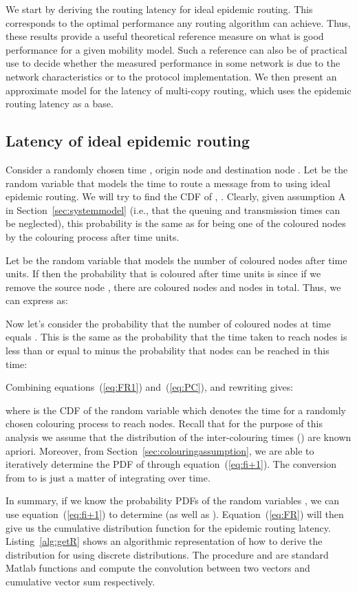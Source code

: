 \documentclass{article}
\begin{document}
We start by deriving the routing latency for ideal epidemic
routing. This corresponds to the optimal performance any routing
algorithm can achieve. Thus, these results provide a useful
theoretical reference measure on what is good performance for a given
mobility model. Such a reference can also be of practical use to
decide whether the measured performance in some network is due to the
network characteristics or to the protocol implementation. We then
present an approximate model for the latency of multi-copy routing,
which uses the epidemic routing latency as a base.


\subsection{Latency of ideal epidemic routing}

Consider a randomly chosen time , origin node  and destination
node . Let  be the random variable that models the time
to route a message from  to  using ideal epidemic routing. We
will try to find the CDF of , . Clearly, given
assumption A in Section~\ref{sec:systemmodel} (i.e., that the queuing and transmission times can be
neglected), this probability is the same as for  being one of the
coloured nodes by the colouring process  after  time
units.

Let  be the random variable that models the number of coloured
nodes after  time units. If  then the probability that 
is coloured after  time units is  since if we remove
the source node , there are  coloured nodes and  nodes in
total. Thus, we can express  as:

Now let's consider the probability  that the number of
coloured nodes at time  equals . This is the same as the
probability that the time taken to reach  nodes is less than or
equal to  minus the probability that  nodes can be reached in this time:

Combining equations~(\ref{eq:FR1}) and~(\ref{eq:PC}), and rewriting gives:

where  is the CDF of the random variable 
which denotes the time for a randomly chosen colouring process to
reach  nodes.  Recall that for the purpose of this analysis we
assume that the distribution of the inter-colouring times ()
are known apriori. Moreover, from
Section~\ref{sec:colouringassumption}, we are able to iteratively
determine the PDF of  through equation~(\ref{eq:fi+1}). The
conversion from  to  is just a matter of integrating
over time.

In summary, if we know the probability PDFs of the random variables
, we can use equation~(\ref{eq:fi+1}) to determine 
(as well as ). Equation~(\ref{eq:FR}) will then give us the
cumulative distribution function for the epidemic routing latency.
Listing~\ref{alg:getR} shows an algorithmic representation of how to
derive the distribution for  using discrete distributions. The
procedure  and  are standard Matlab
functions and compute the convolution between two vectors and
cumulative vector sum respectively.
\end{document}
